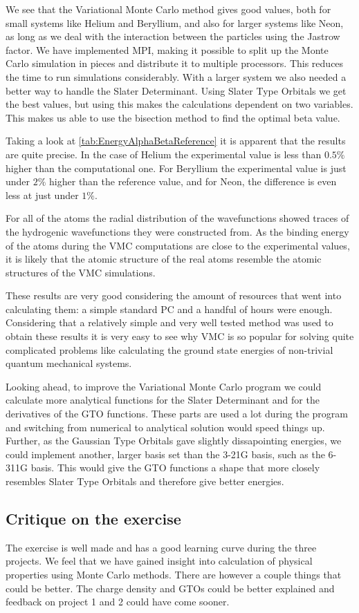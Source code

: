 We see that the Variational Monte Carlo method gives good values, both for small systems like Helium and Beryllium, and also for larger systems like Neon, as long as we deal with the interaction between the particles using the Jastrow factor. We have implemented MPI, making it possible to split up the Monte Carlo simulation in pieces and distribute it to multiple processors. This reduces the time to run simulations considerably. With a larger system we also needed a better way to handle the Slater Determinant. Using Slater Type Orbitals we get the best values, but using this makes the calculations dependent on two variables. This makes us able to use the bisection method to find the optimal beta value. 

Taking a look at \ref{tab:EnergyAlphaBetaReference} it is apparent that the results are quite precise. In the case of Helium the experimental value is less than $0.5\%$ higher than the computational one. For Beryllium the experimental value is just under $2\%$ higher than the reference value, and for Neon, the difference is even less at just under $1\%$. 

For all of the atoms the radial distribution of the wavefunctions showed traces of the hydrogenic wavefunctions they were constructed from. As the binding energy of the atoms during the VMC computations are close to the experimental values, it is likely that the atomic structure of the real atoms resemble the atomic structures of the VMC simulations.  

These results are very good considering the amount of resources that went into calculating them: a simple standard PC and a handful of hours were enough. Considering that a relatively simple and very well tested method was used to obtain these results it is very easy to see why VMC is so popular for solving quite complicated problems like calculating the ground state energies of non-trivial quantum mechanical systems.

Looking ahead, to improve the Variational Monte Carlo program we could calculate more analytical functions for the Slater Determinant and for the derivatives of the GTO functions. These parts are used a lot during the program and switching from numerical to analytical solution would speed things up. Further, as the Gaussian Type Orbitals gave slightly dissapointing energies, we could implement another, larger basis set than the 3-21G basis, such as the 6-311G basis. This would give the GTO functions a shape that more closely resembles Slater Type Orbitals and therefore give better energies.  

\subsection{Critique on the exercise}
	The exercise is well made and has a good learning curve during the three projects. We feel that we have gained insight into calculation of physical properties using Monte Carlo methods. There are however a couple things that could be better. The charge density and GTOs could be better explained and feedback on project 1 and 2 could have come sooner. 